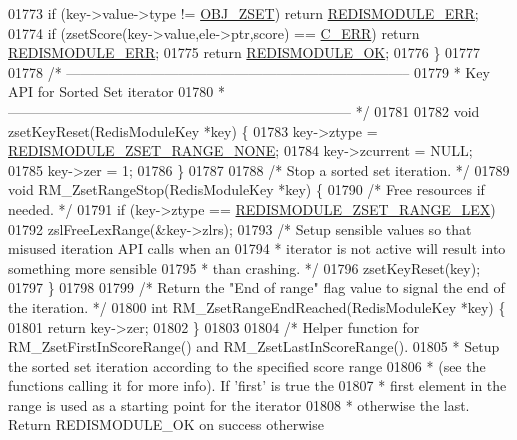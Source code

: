 \begin{DoxyCode}
{{{01773     \textcolor{keywordflow}{if} (key->value->type != \hyperlink{server_8h_a8c356422ddbc03bd77694880a30a1953}{OBJ\_ZSET}) \textcolor{keywordflow}{return} \hyperlink{redismodule_8h_a3df6f5bd5247289e66f44437a7cddd49}{REDISMODULE\_ERR};
01774     \textcolor{keywordflow}{if} (zsetScore(key->value,ele->ptr,score) == \hyperlink{server_8h_af98ac28d5f4d23d7ed5985188e6fb7d1}{C\_ERR}) \textcolor{keywordflow}{return} 
      \hyperlink{redismodule_8h_a3df6f5bd5247289e66f44437a7cddd49}{REDISMODULE\_ERR};
01775     \textcolor{keywordflow}{return} \hyperlink{redismodule_8h_a1bc5bfd69abcd378ff52c640adc5418d}{REDISMODULE\_OK};
01776 \}
01777 
01778 \textcolor{comment}{/* --------------------------------------------------------------------------}
01779 \textcolor{comment}{ * Key API for Sorted Set iterator}
01780 \textcolor{comment}{ * -------------------------------------------------------------------------- */}
01781 
01782 \textcolor{keywordtype}{void} zsetKeyReset(RedisModuleKey *key) \{
01783     key->ztype = \hyperlink{module_8c_aa51c11fc138f0fbbc6d8dc1e86bf320a}{REDISMODULE\_ZSET\_RANGE\_NONE};
01784     key->zcurrent = NULL;
01785     key->zer = 1;
01786 \}
01787 
01788 \textcolor{comment}{/* Stop a sorted set iteration. */}
01789 \textcolor{keywordtype}{void} RM\_ZsetRangeStop(RedisModuleKey *key) \{
01790     \textcolor{comment}{/* Free resources if needed. */}
01791     \textcolor{keywordflow}{if} (key->ztype == \hyperlink{module_8c_a36d7bac3b2781ba9b076ee6feee141a1}{REDISMODULE\_ZSET\_RANGE\_LEX})
01792         zslFreeLexRange(&key->zlrs);
01793     \textcolor{comment}{/* Setup sensible values so that misused iteration API calls when an}
01794 \textcolor{comment}{     * iterator is not active will result into something more sensible}
01795 \textcolor{comment}{     * than crashing. */}
01796     zsetKeyReset(key);
01797 \}
01798 
01799 \textcolor{comment}{/* Return the "End of range" flag value to signal the end of the iteration. */}
01800 \textcolor{keywordtype}{int} RM\_ZsetRangeEndReached(RedisModuleKey *key) \{
01801     \textcolor{keywordflow}{return} key->zer;
01802 \}
01803 
01804 \textcolor{comment}{/* Helper function for RM\_ZsetFirstInScoreRange() and RM\_ZsetLastInScoreRange().}
01805 \textcolor{comment}{ * Setup the sorted set iteration according to the specified score range}
01806 \textcolor{comment}{ * (see the functions calling it for more info). If 'first' is true the}
01807 \textcolor{comment}{ * first element in the range is used as a starting point for the iterator}
01808 \textcolor{comment}{ * otherwise the last. Return REDISMODULE\_OK on success otherwise}
}}}
\end{DoxyCode}
